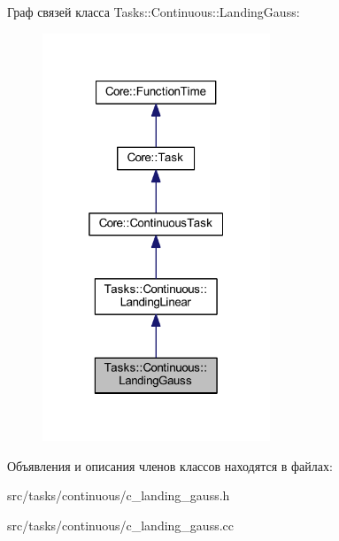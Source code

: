 Граф связей класса Tasks\+:\+:Continuous\+:\+:Landing\+Gauss\+:\nopagebreak
\begin{figure}[H]
\begin{center}
\leavevmode
\includegraphics[width=193pt]{class_tasks_1_1_continuous_1_1_landing_gauss__coll__graph}
\end{center}
\end{figure}


Объявления и описания членов классов находятся в файлах\+:\begin{DoxyCompactItemize}
\item 
src/tasks/continuous/c\+\_\+landing\+\_\+gauss.\+h\item 
src/tasks/continuous/c\+\_\+landing\+\_\+gauss.\+cc\end{DoxyCompactItemize}
